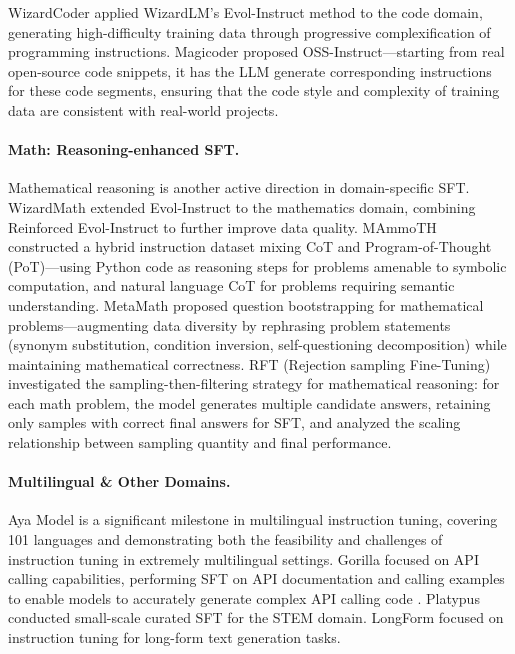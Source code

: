 WizardCoder \citep{luo2023wizardcoder} applied WizardLM's Evol-Instruct method to the code domain,
generating high-difficulty training data through progressive complexification of programming instructions.
Magicoder \citep{wei2023magicoder} proposed OSS-Instruct---starting
from real open-source code snippets, it has the LLM generate corresponding instructions for these code segments,
ensuring that the code style and complexity of training data are consistent with real-world projects.

\paragraph{Math: Reasoning-enhanced SFT.}
Mathematical reasoning is another active direction in domain-specific SFT.
WizardMath \citep{luo2023wizardmath} extended Evol-Instruct to the mathematics domain,
combining Reinforced Evol-Instruct to further improve data quality.
MAmmoTH \citep{yue2023mammoth} constructed a hybrid instruction dataset mixing CoT and Program-of-Thought (PoT)---using
Python code as reasoning steps for problems amenable to symbolic computation,
and natural language CoT for problems requiring semantic understanding.
MetaMath \citep{yu2023metamath} proposed question bootstrapping for mathematical problems---augmenting
data diversity by rephrasing problem statements (synonym substitution, condition inversion, self-questioning decomposition)
while maintaining mathematical correctness.
RFT \citep{yuan2023rft} (Rejection sampling Fine-Tuning)
investigated the sampling-then-filtering strategy for mathematical reasoning:
for each math problem, the model generates multiple candidate answers, retaining only samples with correct final answers for SFT,
and analyzed the scaling relationship between sampling quantity and final performance.

\paragraph{Multilingual \& Other Domains.}
Aya Model \citep{ustun2024aya} is a significant milestone in multilingual instruction tuning,
covering 101 languages and demonstrating both the feasibility and challenges of instruction tuning in extremely multilingual settings.
Gorilla \citep{patil2023gorilla} focused on API calling capabilities,
performing SFT on API documentation and calling examples to enable models to accurately generate complex API calling code
.
Platypus \citep{lee2023platypus} conducted small-scale curated SFT for the STEM domain.
LongForm \citep{koksal2023longform} focused on instruction tuning for long-form text generation tasks.


